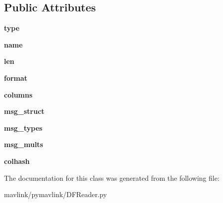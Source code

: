 \subsection*{Public Attributes}
\begin{DoxyCompactItemize}
\item 
\mbox{\label{classpymavlink_1_1DFReader_1_1DFFormat_a2b5d2f5837b6a88c5155cf0e242f740f}} 
{\bfseries type}
\item 
\mbox{\label{classpymavlink_1_1DFReader_1_1DFFormat_ad341e8512ba46835ee1e029d4141231f}} 
{\bfseries name}
\item 
\mbox{\label{classpymavlink_1_1DFReader_1_1DFFormat_a82a75e79f81f3c05e078851728fff0ea}} 
{\bfseries len}
\item 
\mbox{\label{classpymavlink_1_1DFReader_1_1DFFormat_a7b229df2142b24a075c4c9d4951fb5de}} 
{\bfseries format}
\item 
\mbox{\label{classpymavlink_1_1DFReader_1_1DFFormat_a3e7e476b92d901c1ec6460257d64a121}} 
{\bfseries columns}
\item 
\mbox{\label{classpymavlink_1_1DFReader_1_1DFFormat_a9bc2916a84e7bf5e7ef039278545f5cf}} 
{\bfseries msg\+\_\+struct}
\item 
\mbox{\label{classpymavlink_1_1DFReader_1_1DFFormat_a4f38e75910cecd56732509e3ae05c2a7}} 
{\bfseries msg\+\_\+types}
\item 
\mbox{\label{classpymavlink_1_1DFReader_1_1DFFormat_a4eee14ede63ba3a5408fbd0329876b4c}} 
{\bfseries msg\+\_\+mults}
\item 
\mbox{\label{classpymavlink_1_1DFReader_1_1DFFormat_ad31fa0c10cafcc57757c2c5b78217600}} 
{\bfseries colhash}
\end{DoxyCompactItemize}


The documentation for this class was generated from the following file\+:\begin{DoxyCompactItemize}
\item 
mavlink/pymavlink/D\+F\+Reader.\+py\end{DoxyCompactItemize}
